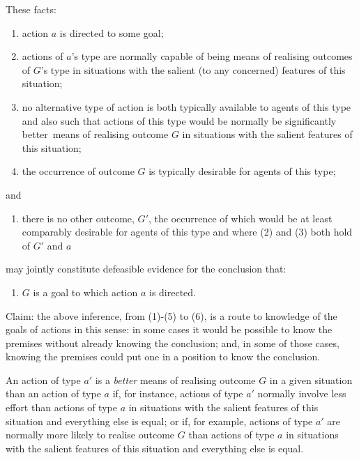 \documentclass[12pt]{extarticle}
\begin{document}
\begin{multicols*}{3}
These facts:
%
\begin{enumerate}
%
\item action $a$ is directed to some goal;
%
\item actions of $a$'s type are normally capable of being means of realising outcomes of $G$'s type in situations with the salient (to any concerned) features of this situation;
% 
\item no alternative type of action is both 
typically available to agents of this type 
and also 
such that actions of this type would be normally be significantly better\footnotemark \ means of realising outcome $G$ in situations with the salient features of this situation;
%
\item the occurrence of outcome $G$ is typically desirable for agents of this type;
%
\end{enumerate}
%
and
%
\begin{enumerate}[resume]
\item there is no other outcome, $G'$, 
the occurrence of which would be at least comparably desirable for agents of this type 
and where (2) and (3) both hold of $G'$ and $a$
%
\end{enumerate}
%
may jointly constitute defeasible evidence for the conclusion that:
%
\begin{enumerate}[resume]
\item $G$ is a goal to which action $a$ is directed.
\end{enumerate}
%

  Claim: the above inference, from (1)-(5) to (6), is a route to knowledge of the goals of actions in this sense:
in some cases
it would be possible to know the premises without already knowing the conclusion;
and, 
in some of those cases,
knowing the premises could put one in a position to know the conclusion.

An action of type $a'$ is a \emph{better} means of realising outcome $G$ in a given situation than an action of type $a$ if, for instance, actions of type $a'$ normally involve less effort than actions of type $a$
in situations with the salient features of this situation
and everything else is equal;
or if, for example, actions of type $a'$ are normally more likely to realise outcome $G$ than actions of type $a$
in situations with the salient features of this situation
and everything else is equal.



\end{multicols*}
\end{document}
